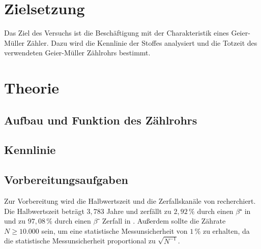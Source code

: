 \section{Zielsetzung}
\label{sec:Zielsetzung}
Das Ziel des Versuchs ist die Beschäftigung mit der Charakteristik eines Geier-Müller 
Zähler. Dazu wird die Kennlinie der Stoffes  analysiert und 
die Totzeit des verwendeten Geier-Müller Zählrohrs bestimmt.
\section{Theorie}
\label{sec:Theorie}
\subsection{Aufbau und Funktion des Zählrohrs}

\subsection{Kennlinie}

\subsection{Vorbereitungsaufgaben}
\label{sec:Vorbereitungsaufgaben}
Zur Vorbereitung wird die Halbwertszeit und die Zerfallskanäle von 
recherchiert. Die Halbwertszeit beträgt $3,783$ Jahre und 
zerfällt zu $2,92 \, \%$ durch einen $\beta⁺$ in  und zu $97,08 \, \%$ 
durch einen $\beta⁻$ Zerfall in  \cite{vorbereitung}. 
Außerdem sollte die Zährate $N \geq 10.000$ sein, um eine statistische Messunsicherheit
von $1 \, \%$ zu erhalten, da die statistische Messunsicherheit proportional zu 
$\sqrt{N^{-1}}$.
